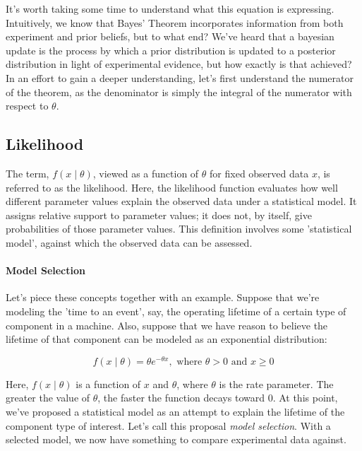 \documentclass[12pt]{article}
\begin{document}
\noindent It's worth taking some time to understand what this equation is expressing. Intuitively, we know that Bayes' Theorem incorporates information from both experiment and prior beliefs, but to what end? We've heard that a bayesian update is the process by which a prior distribution is updated to a posterior distribution in light of experimental evidence, but how exactly is that achieved? In an effort to gain a deeper understanding, let's first understand the numerator of the theorem, as the denominator is simply the integral of the numerator with respect to $\theta$. \\

\subsection*{Likelihood}
\noindent The term, $f(x\mid\theta)$, viewed as a function of $\theta$ for fixed observed data $x$, is referred to as the likelihood. Here, the likelihood function evaluates how well different parameter values explain the observed data under a statistical model. It assigns relative support to parameter values; it does not, by itself, give probabilities of those parameter values. This definition involves some 'statistical model', against which the observed data can be assessed.

\paragraph{Model Selection}
Let's piece these concepts together with an example. Suppose that we're modeling the 'time to an event', say, the operating lifetime of a certain type of component in a machine. Also, suppose that we have reason to believe the lifetime of that component can be modeled as an exponential distribution:

\begin{equation}
f(x \mid \theta) = \theta e^{-\theta x}, \text{ where } \theta > 0 \text{ and } x \ge 0
\end{equation}

\noindent Here, $f(x \mid \theta)$ is a function of $x$ and $\theta$, where $\theta$ is the rate parameter. The greater the value of $\theta$, the faster the function decays toward 0. At this point, we've proposed a statistical model as an attempt to explain the lifetime of the component type of interest. Let's call this proposal \textit{model selection}. With a selected model, we now have something to compare experimental data against. 
\end{document}
